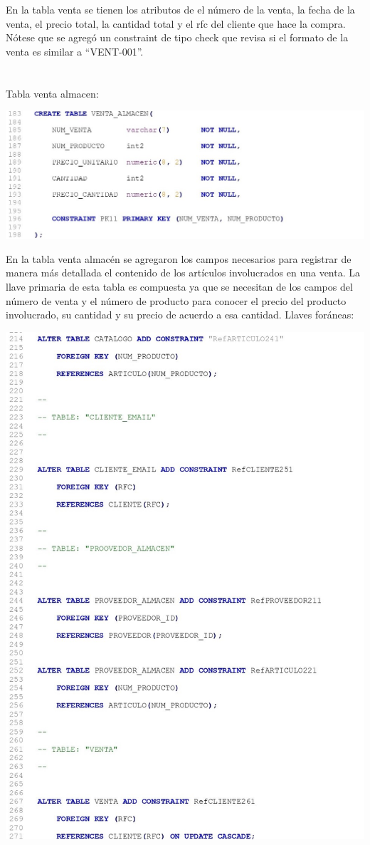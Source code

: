 \documentclass[letter,12pt]{article} %
\begin{document}
En la tabla venta se tienen los atributos de el número de la venta, la fecha de la venta, el precio total, la cantidad total y el rfc del cliente que hace la compra.
Nótese que se agregó un constraint de tipo check que revisa si el formato de la venta es similar a “VENT-001”.
\\\\\\
Tabla venta almacen:
\begin{center} 
\includegraphics[scale=0.90]{imagenes/DDL08.jpg}
\end{center}
En la tabla venta almacén se agregaron los campos necesarios para registrar de manera más detallada el contenido de los artículos involucrados en una venta. La llave primaria de esta tabla es compuesta ya que se necesitan de los campos del número de venta y el número de producto para conocer el precio del producto involucrado, su cantidad  y su precio de acuerdo a esa cantidad. 
\newpage
Llaves foráneas:
\begin{center} 
\includegraphics[scale=0.90]{imagenes/DDL09.jpg}
\end{center}
\end{document}

